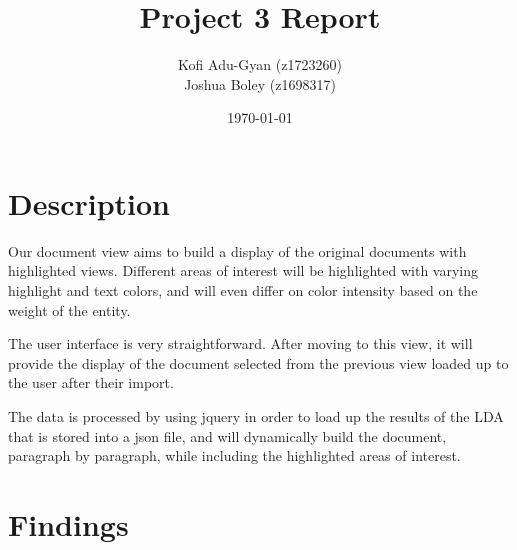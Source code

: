 \documentclass{scrartcl}
\title{Project 3 Report}
\date{{\small \today}}
\author{Kofi Adu-Gyan (z1723260)\\Joshua Boley (z1698317)}
\begin{document}
\maketitle

\section*{Description}

Our document view aims to build a display of the original documents with highlighted views. Different areas of interest will be highlighted with varying highlight and text colors, and will even differ on color intensity based on the weight of the entity. 

The user interface is very straightforward. After moving to this view, it will provide the display of the document selected from the previous view loaded up to the user after their import. 

The data is processed by using jquery in order to load up the results of the LDA that is stored into a json file, and will dynamically build the document, paragraph by paragraph, while including the highlighted areas of interest. 

\section*{Findings}
\end{document}

